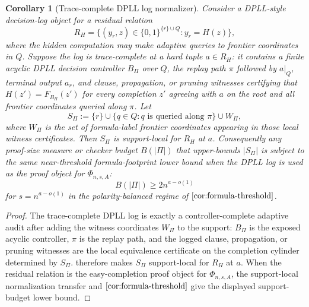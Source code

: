 \documentclass[11pt]{article}
\newtheorem{corollary}[theorem]{Corollary}
\theoremstyle{definition}
\newcommand{\bits}{\{0,1\}}
\begin{document}
\begin{corollary}[Trace-complete DPLL log normalizer]\label{cor:trace-complete-dpll}
Consider a DPLL-style decision-log object for a residual relation
\[
  R_H=\{(y_r,z)\in\bits^{\{r\}\cup Q}:y_r=H(z)\},
\]
where the hidden computation may make adaptive queries to frontier coordinates in \(Q\).  Suppose the log is trace-complete at a hard tuple \(a\in R_H\): it contains a finite acyclic DPLL decision controller \(B_\Pi\) over \(Q\), the replay path \(\pi\) followed by \(a|_Q\), terminal output \(a_r\), and clause, propagation, or pruning witnesses certifying that \(H(z')=F_{B_\Pi}(z')\) for every completion \(z'\) agreeing with \(a\) on the root and all frontier coordinates queried along \(\pi\).  Let
\[
  S_\Pi:=\{r\}\cup\{q\in Q:q\text{ is queried along }\pi\}\cup W_\Pi,
\]
where \(W_\Pi\) is the set of formula-label frontier coordinates appearing in those local witness certificates.  Then \(S_\Pi\) is support-local for \(R_H\) at \(a\).  Consequently any proof-size measure or checker budget \(B(|\Pi|)\) that upper-bounds \(|S_\Pi|\) is subject to the same near-threshold formula-footprint lower bound when the DPLL log is used as the proof object for \(\Phi_{n,s,A}\):
\[
  B(|\Pi|)\ge 2n^{a-o(1)}
\]
for \(s=n^{a-o(1)}\) in the polarity-balanced regime of \(\Cref{cor:formula-threshold}\).
\end{corollary}

\begin{proof}
The trace-complete DPLL log is exactly a controller-complete adaptive audit after adding the witness coordinates \(W_\Pi\) to the support: \(B_\Pi\) is the exposed acyclic controller, \(\pi\) is the replay path, and the logged clause, propagation, or pruning witnesses are the local equivalence certificate on the completion cylinder determined by \(S_\Pi\).   therefore makes \(S_\Pi\) support-local for \(R_H\) at \(a\).  When the residual relation is the easy-completion proof object for \(\Phi_{n,s,A}\), the support-local normalization transfer and \(\Cref{cor:formula-threshold}\) give the displayed support-budget lower bound.
\end{proof}
\end{document}

